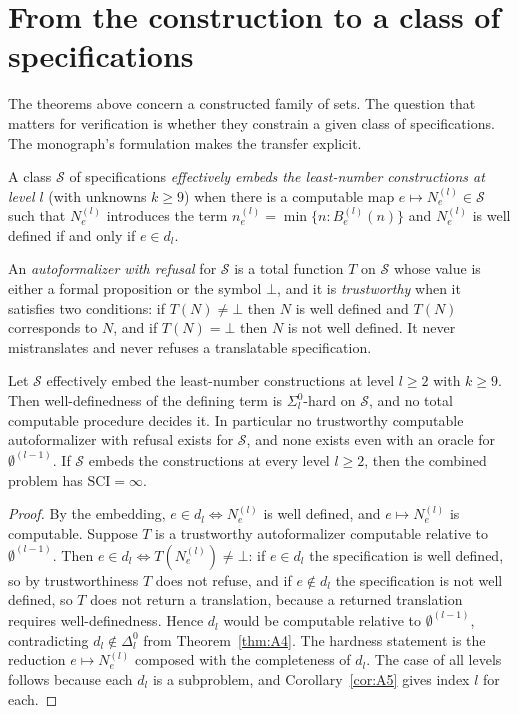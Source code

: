\section{From the construction to a class of specifications}

The theorems above concern a constructed family of sets. The question that matters for verification is whether they constrain a given class of specifications. The monograph's formulation makes the transfer explicit.

\begin{definition}
A class $\mathcal{S}$ of specifications \emph{effectively embeds the least-number constructions at level $l$} (with unknowns $k \ge 9$) when there is a computable map $e \mapsto N^{(l)}_e \in \mathcal{S}$ such that $N^{(l)}_e$ introduces the term $n^{(l)}_e = \min\{ n : B^{(l)}_e(n) \}$ and $N^{(l)}_e$ is well defined if and only if $e \in d_l$.
\end{definition}

An \emph{autoformalizer with refusal} for $\mathcal{S}$ is a total function $T$ on $\mathcal{S}$ whose value is either a formal proposition or the symbol $\bot$, and it is \emph{trustworthy} when it satisfies two conditions: if $T(N) \ne \bot$ then $N$ is well defined and $T(N)$ corresponds to $N$, and if $T(N) = \bot$ then $N$ is not well defined. It never mistranslates and never refuses a translatable specification.

\begin{theorem}[RV-005]
\label{thm:rv005}
Let $\mathcal{S}$ effectively embed the least-number constructions at level $l \ge 2$ with $k \ge 9$. Then well-definedness of the defining term is $\Sigma^0_l$-hard on $\mathcal{S}$, and no total computable procedure decides it. In particular no trustworthy computable autoformalizer with refusal exists for $\mathcal{S}$, and none exists even with an oracle for $\emptyset^{(l-1)}$. If $\mathcal{S}$ embeds the constructions at every level $l \ge 2$, then the combined problem has $\mathrm{SCI} = \infty$.
\end{theorem}

\begin{proof}
By the embedding, $e \in d_l \iff N^{(l)}_e$ is well defined, and $e \mapsto N^{(l)}_e$ is computable. Suppose $T$ is a trustworthy autoformalizer computable relative to $\emptyset^{(l-1)}$. Then $e \in d_l \iff T(N^{(l)}_e) \ne \bot$: if $e \in d_l$ the specification is well defined, so by trustworthiness $T$ does not refuse, and if $e \notin d_l$ the specification is not well defined, so $T$ does not return a translation, because a returned translation requires well-definedness. Hence $d_l$ would be computable relative to $\emptyset^{(l-1)}$, contradicting $d_l \notin \Delta^0_l$ from Theorem~\ref{thm:A4}. The hardness statement is the reduction $e \mapsto N^{(l)}_e$ composed with the completeness of $d_l$. The case of all levels follows because each $d_l$ is a subproblem, and Corollary~\ref{cor:A5} gives index $l$ for each.
\end{proof}

